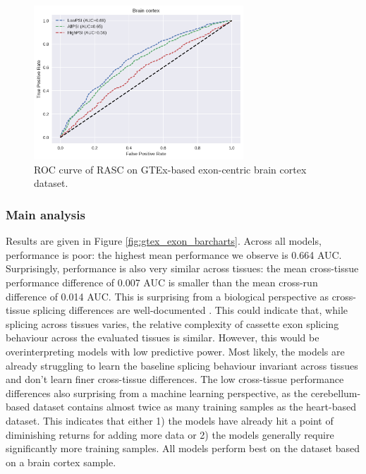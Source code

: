 \begin{figure}
	\centering\includegraphics[width=0.7\textwidth]{../visualizations/ch5-results/gtex_exon_brain_roc.png} 
	\caption{
	ROC curve of RASC on GTEx-based exon-centric brain cortex dataset. 
  }
	\label{fig:gtex_exon_roc}
\end{figure}
\subsubsection{Main analysis}
Results are given in Figure \ref{fig:gtex_exon_barcharts}. Across all models, performance is poor: the highest mean performance we observe is 0.664 AUC. Surprisingly, performance is also very similar across tissues: the mean cross-tissue performance difference of 0.007 AUC is smaller than the mean cross-run difference of 0.014 AUC. This is surprising from a biological perspective as cross-tissue splicing differences are well-documented \cite{crosstissuesplicing}. 
This could indicate that, while splicing across tissues varies, the relative complexity of cassette exon splicing behaviour across the evaluated tissues is similar. However, this would be overinterpreting models with low predictive power.
Most likely, the models are already struggling to learn the baseline splicing behaviour invariant across tissues and don't learn finer cross-tissue differences. 
The low cross-tissue performance differences also surprising from a machine learning perspective, as the cerebellum-based dataset contains almost twice as many training samples as the heart-based dataset. This indicates that either 1) the models have already hit a point of diminishing returns for adding more data or 2) the models generally require significantly more training samples. All models perform best on the dataset based on a brain cortex sample. 

